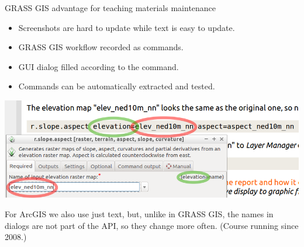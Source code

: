 \documentclass[xcolor={dvipsnames,usenames},beamer]{beamer}
\begin{document}
\begin{frame}{GRASS GIS advantage for teaching materials maintenance}

\begin{itemize}
 \item Screenshots are hard to update while text is easy to update.
 \item GRASS GIS workflow recorded as commands.
 \item GUI dialog filled according to the command.
 \scriptsize \item Commands can be automatically extracted and tested.
\end{itemize}

\bigskip

\includegraphics[width=\textwidth]{./images/edu/grass_cmd_gui}

\bigskip
\bigskip

\small
For ArcGIS we also use just text, but, unlike in GRASS GIS,
the names in dialogs are not part of the API, so they change more often.
{\scriptsize(Course running since 2008.)}

\end{frame}
\end{document}
